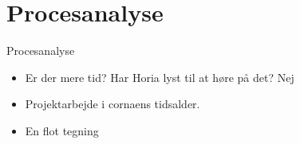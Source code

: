 \section{Procesanalyse}
\begin{frame}{Procesanalyse}
\begin{itemize}
\item Er der mere tid? Har Horia lyst til at høre på det? Nej
\item Projektarbejde i cornaens tidsalder.
\item En flot tegning
\end{itemize}
\end{frame}
